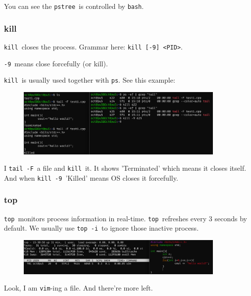 \documentclass[12pt]{ctexart}
\begin{document}
You can see the \texttt{pstree}\ is controlled by \texttt{bash}.

\subsubsection{\textbf{kill}}

\texttt{kill}\ closes the process. Grammar here:
\texttt{kill\ {[}-9{]}\ \textless{}PID\textgreater{}}.

\texttt{-9}\ means close forcefully (or kill).

\texttt{kill}\ is usually used together with \texttt{ps}. See this
example:

\begin{figure}[H]
    \centering
    \includegraphics[width=0.9\textwidth,keepaspectratio]{assets/Linux/1.10 Linux process commands/3.png}
\end{figure}

I \texttt{tail\ -F}\ a file and \texttt{kill}\ it. It shows 'Terminated'
which means it closes itself. And when \texttt{kill\ -9}\ 'Killed' means
OS closes it forcefully.

\subsubsection{\textbf{top}}

\texttt{top}\ monitors process information in real-time. \texttt{top}\
refreshes every 3 seconds by default. We usually use \texttt{top\ -i}\ to
ignore those inactive process.

\begin{figure}[H]
    \centering
    \includegraphics[width=0.9\textwidth,keepaspectratio]{assets/Linux/1.10 Linux process commands/4.png}
\end{figure}

Look, I am \texttt{vim}-ing a file. And there're more
left.
\end{document}
